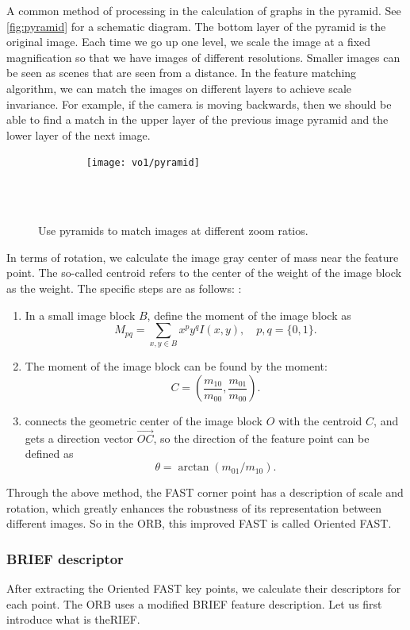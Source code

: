 A common method of processing in the calculation of graphs in the pyramid. See \autoref{fig:pyramid} for a schematic diagram. The bottom layer of the pyramid is the original image. Each time we go up one level, we scale the image at a fixed magnification so that we have images of different resolutions. Smaller images can be seen as scenes that are seen from a distance. In the feature matching algorithm, we can match the images on different layers to achieve scale invariance. For example, if the camera is moving backwards, then we should be able to find a match in the upper layer of the previous image pyramid and the lower layer of the next image.

\begin{figure}[!t]
    \centering
    \texttt{[image: vo1/pyramid]}\\
    \caption{Use pyramids to match images at different zoom ratios. }
    \label{fig:pyramid}
\end{figure}

In terms of rotation, we calculate the image gray center of mass near the feature point. The so-called centroid refers to the center of the weight of the image block as the weight. The specific steps are as follows: \textsuperscript{\cite{Rosin1999}}:
\begin{enumerate}
\item In a small image block $B$, define the moment of the image block as
\[
M_{pq}=\sum_{x,y \in B}x^{p}y^{q}I(x,y), \quad p, q = \{0,1\}.
\]
\item The moment of the image block can be found by the moment:
\[
C=(\frac{m_{10}}{m_{00}},\frac{m_{01}}{m_{00}}).
\]
\item connects the geometric center of the image block $O$ with the centroid $C$, and gets a direction vector $\overrightarrow{OC}$, so the direction of the feature point can be defined as
\[
\theta = \arctan(m_{01}/m_{10}).
\]
\end{enumerate}
Through the above method, the FAST corner point has a description of scale and rotation, which greatly enhances the robustness of its representation between different images. So in the ORB, this improved FAST is called Oriented FAST.
\subsubsection{BRIEF descriptor}
After extracting the Oriented FAST key points, we calculate their descriptors for each point. The ORB uses a modified BRIEF feature description. Let us first introduce what is theRIEF.

